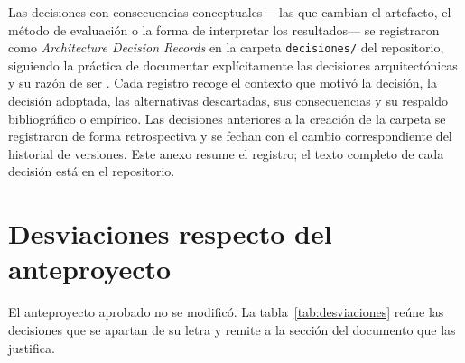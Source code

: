 \label{anexo:decisiones}

Las decisiones con consecuencias conceptuales ---las que cambian el artefacto, el método de evaluación o la forma de interpretar los resultados--- se registraron como \textit{Architecture Decision Records} en la carpeta \texttt{decisiones/} del repositorio, siguiendo la práctica de documentar explícitamente las decisiones arquitectónicas y su razón de ser \citep{TyreeAkerman2005, ADR}. Cada registro recoge el contexto que motivó la decisión, la decisión adoptada, las alternativas descartadas, sus consecuencias y su respaldo bibliográfico o empírico. Las decisiones anteriores a la creación de la carpeta se registraron de forma retrospectiva y se fechan con el cambio correspondiente del historial de versiones. Este anexo resume el registro; el texto completo de cada decisión está en el repositorio.

\section{Desviaciones respecto del anteproyecto}
El anteproyecto aprobado no se modificó. La tabla~\ref{tab:desviaciones} reúne las decisiones que se apartan de su letra y remite a la sección del documento que las justifica.


